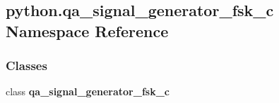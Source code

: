 \subsection{python.\+qa\+\_\+signal\+\_\+generator\+\_\+fsk\+\_\+c Namespace Reference}
\label{namespacepython_1_1qa__signal__generator__fsk__c}
\subsubsection*{Classes}
\begin{DoxyCompactItemize}
\item 
class {\bf qa\+\_\+signal\+\_\+generator\+\_\+fsk\+\_\+c}
\end{DoxyCompactItemize}
